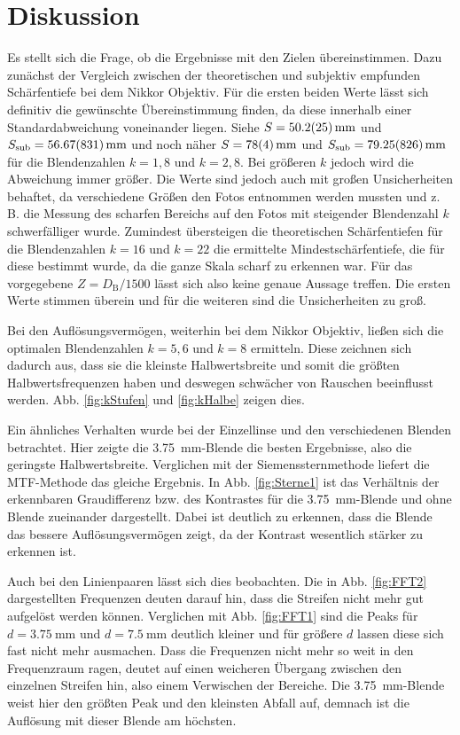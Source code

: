 \section{Diskussion}
	
	Es stellt sich die Frage, ob die Ergebnisse mit den Zielen übereinstimmen.
	Dazu zunächst der Vergleich zwischen der theoretischen und subjektiv empfunden Schärfentiefe bei dem Nikkor Objektiv.
	Für die ersten beiden Werte lässt sich definitiv die gewünschte Übereinstimmung finden, da diese innerhalb einer Standardabweichung voneinander liegen.
	Siehe $S = \SI{50.2+-2.5}{\milli\meter}$ und $S_\text{sub} = \SI{56,67+-8,31}{\milli\meter}$ und noch näher $S = \SI{78+-4}{\milli\meter}$ und $S_\text{sub} = \SI{79,25+-8,26}{\milli\meter}$ für die Blendenzahlen $k = 1,8$ und $k = 2,8$.
	Bei größeren $k$ jedoch wird die Abweichung immer größer.
	Die Werte sind jedoch auch mit großen Unsicherheiten behaftet, da verschiedene Größen den Fotos entnommen werden mussten und z. B. die Messung des scharfen Bereichs auf den Fotos mit steigender Blendenzahl $k$ schwerfälliger wurde.
	Zumindest übersteigen die theoretischen Schärfentiefen für die Blendenzahlen $k = 16$ und $k = 22$ die ermittelte Mindestschärfentiefe, die für diese bestimmt wurde, da die ganze Skala scharf zu erkennen war.
	Für das vorgegebene $Z = D_\text{B}/1500$ lässt sich also keine genaue Aussage treffen.
	Die ersten Werte stimmen überein und für die weiteren sind die Unsicherheiten zu groß. 
	
	Bei den Auflösungsvermögen, weiterhin bei dem Nikkor Objektiv, ließen sich die optimalen Blendenzahlen $k = 5,6$ und $k = 8$ ermitteln.
	Diese zeichnen sich dadurch aus, dass sie die kleinste Halbwertsbreite und somit die größten Halbwertsfrequenzen haben und deswegen schwächer von Rauschen beeinflusst werden.
	Abb. \ref{fig:kStufen} und \ref{fig:kHalbe} zeigen dies.
	
	Ein ähnliches Verhalten wurde bei der Einzellinse und den verschiedenen Blenden betrachtet.
	Hier zeigte die \SI{3,75}{\milli\meter}-Blende die besten Ergebnisse, also die geringste Halbwertsbreite.
	Verglichen mit der Siemenssternmethode liefert die MTF-Methode das gleiche Ergebnis.
	In Abb. \ref{fig:Sterne1} ist das Verhältnis der erkennbaren Graudifferenz bzw. des Kontrastes für die \SI{3,75}{\milli\meter}-Blende und ohne Blende zueinander dargestellt.
	Dabei ist deutlich zu erkennen, dass die Blende das bessere Auflösungsvermögen zeigt, da der Kontrast wesentlich stärker zu erkennen ist.
	
	Auch bei den Linienpaaren lässt sich dies beobachten.
	Die in Abb. \ref{fig:FFT2} dargestellten Frequenzen deuten darauf hin, dass die Streifen nicht mehr gut aufgelöst werden können.
	Verglichen mit Abb. \ref{fig:FFT1} sind die Peaks für $d = \SI{3.75}{\milli\meter}$ und $d = \SI{7.5}{\milli\meter}$ deutlich kleiner und für größere $d$ lassen diese sich fast nicht mehr ausmachen.
	Dass die Frequenzen nicht mehr so weit in den Frequenzraum ragen, deutet auf einen weicheren Übergang zwischen den einzelnen Streifen hin, also einem Verwischen der Bereiche.
	Die \SI{3,75}{\milli\meter}-Blende weist hier den größten Peak und den kleinsten Abfall auf, demnach ist die Auflösung mit dieser Blende am höchsten.
	

